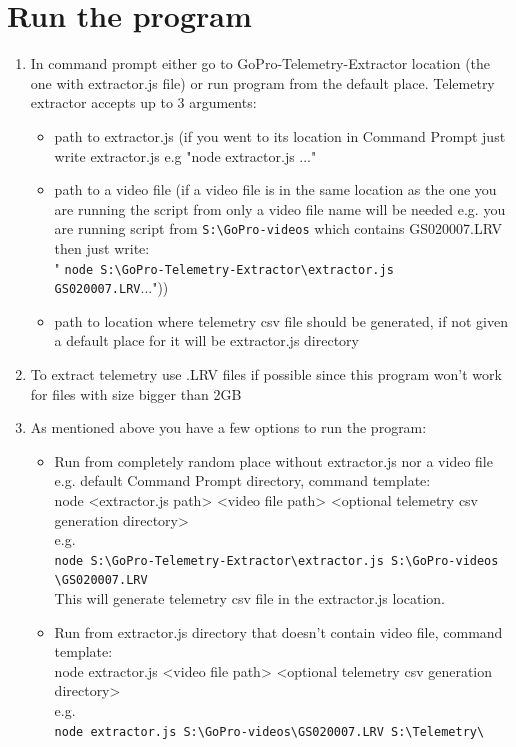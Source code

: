 \documentclass[a4paper,12pt]{book}
\begin{document}
\section{Run the program}
\begin{enumerate}
	\item In command prompt either go to GoPro-Telemetry-Extractor location (the one with extractor.js file) or run program from the default place. Telemetry extractor accepts up to 3 arguments:\\
	\begin{itemize}
		\item path to extractor.js (if you went to its location in Command Prompt just write extractor.js e.g "node extractor.js ..."
		\item path to a video file (if a video file is in the same location as the one you are running the script from only a video file name will be needed e.g. you are running script from \verb|S:\GoPro-videos| which contains GS020007.LRV then just write: \\
		" \verb|node S:\GoPro-Telemetry-Extractor\extractor.js GS020007.LRV|..."))
		\item path to location where telemetry csv file should be generated, if not given a default place for it will be extractor.js directory
	\end{itemize}
	\item To extract telemetry use .LRV files if possible since this program won't work for files with size bigger than 2GB
	\item As mentioned above you have a few options to run the program:
	\begin{itemize}
		\item Run from completely random place without extractor.js nor a video file e.g. default Command Prompt directory, command template: \\
		node <extractor.js path> <video file path> <optional telemetry csv generation directory>\\
		e.g.\\
		\verb|node S:\GoPro-Telemetry-Extractor\extractor.js S:\GoPro-videos|\\ \verb|\GS020007.LRV|\\
		
		This will generate telemetry csv file in the extractor.js location.
		\item Run from extractor.js directory that doesn't contain video file, command template:\\
		node extractor.js <video file path> <optional telemetry csv generation directory>\\
		e.g.\\
		\verb|node extractor.js S:\GoPro-videos\GS020007.LRV S:\Telemetry\|\\
		

\end{itemize}
\end{enumerate}
\end{document}
